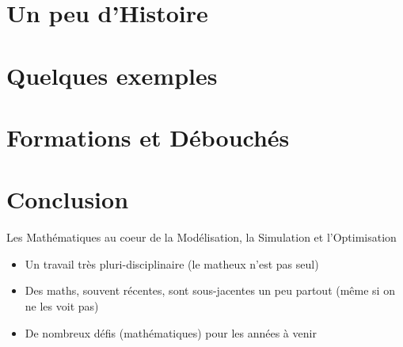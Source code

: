 \documentclass[slideopt,A4]{beamer}
\begin{document}
\section{Un peu d'Histoire}









\section{Quelques exemples}
\label{sec:quelques-exemples}





\section{Formations et Débouchés}



\section{Conclusion}

\begin{frame}{Les Mathématiques au coeur de la Modélisation, la Simulation et l'Optimisation}
  
\begin{itemize}
\item Un travail très pluri-disciplinaire  (le matheux n'est pas seul)
\item Des maths, souvent récentes, sont sous-jacentes un peu partout (même si on ne les voit pas)
\item De nombreux défis (mathématiques) pour les années à venir %
\end{itemize}


\end{frame}
\end{document}
